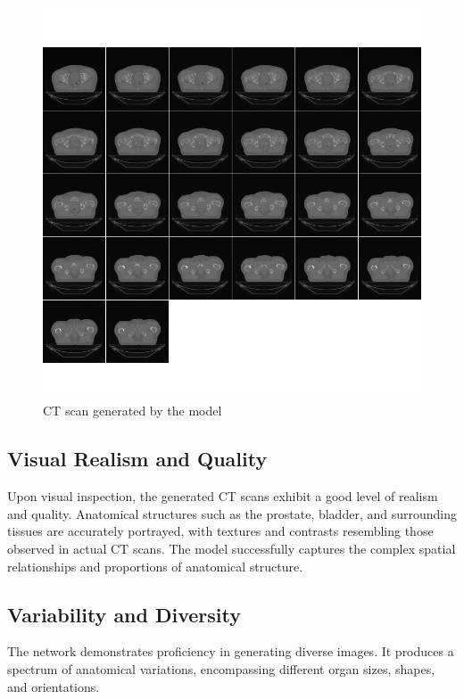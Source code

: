 \documentclass[11pt,a4paper]{report}
\begin{document}
\begin{figure}[H]
	\centering
	\includegraphics[scale=0.5]{images/generatedData3}
    \caption{CT scan generated by the model}
\end{figure}

\newpage
\subsection{Visual Realism and Quality}
Upon visual inspection, the generated CT scans exhibit a good level of realism and quality. Anatomical structures such as the prostate, bladder, and surrounding tissues are accurately portrayed, with textures and contrasts resembling those observed in actual CT scans. The model successfully captures the complex spatial relationships and proportions of anatomical structure.
\subsection{Variability and Diversity}
The network demonstrates proficiency in generating diverse images. It produces a spectrum of anatomical variations, encompassing different organ sizes, shapes, and orientations.
\end{document}
